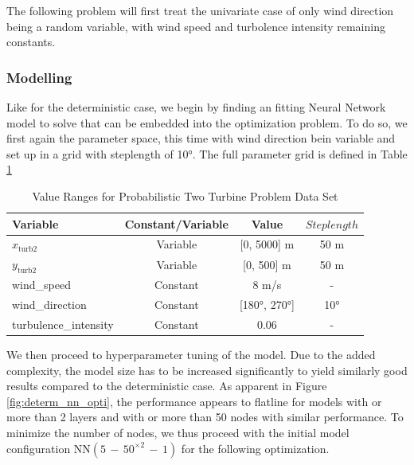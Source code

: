 The following problem will first treat the univariate case of only wind direction being a random variable, with wind speed and turbolence intensity remaining constants. 

\subsubsection{Modelling}

Like for the deterministic case, we begin by finding an fitting Neural Network model to solve that can be embedded into the optimization problem. To do so, we  first again the parameter space, this time with wind direction bein variable and set up in a grid with steplength of 10°. The full parameter grid is defined in Table \ref{tab:val_prob_data}

\begin{table}[ht]
	\centering
	\caption{Value Ranges for Probabilistic Two Turbine Problem Data Set}
	\begin{tabular}{|l|c|c|c|}
		\hline
		\textbf{Variable} & \textbf{Constant/Variable} & \textbf{Value} & \textbf{$Steplength$}\\
		\hline
		$x_{\text{turb2}}$ & Variable & [0, 5000] m & 50 m\\
		$y_{\text{turb2}}$ & Variable & [0, 500] m  & 50 m\\
		wind\_speed & Constant & 8 m/s & -\\
		wind\_direction & Constant & [180°, 270°]& 10° \\
		turbulence\_intensity & Constant & 0.06 & - \\
		\hline
	\end{tabular}
	\label{tab:val_prob_data}
\end{table}

We then proceed to hyperparameter tuning of the model. Due to the added complexity, the model size has to be increased significantly to yield similarly good results compared to the deterministic case. As apparent in Figure \ref{fig:determ_nn_opti}, the performance appears to flatline for models with or more than 2 layers and with or more than 50 nodes with similar performance. To minimize the number of nodes, we thus proceed with the initial model configuration $\text{NN}(5\,{-}\,50^{\times2}\,{-}\,1)$ for the following optimization.



